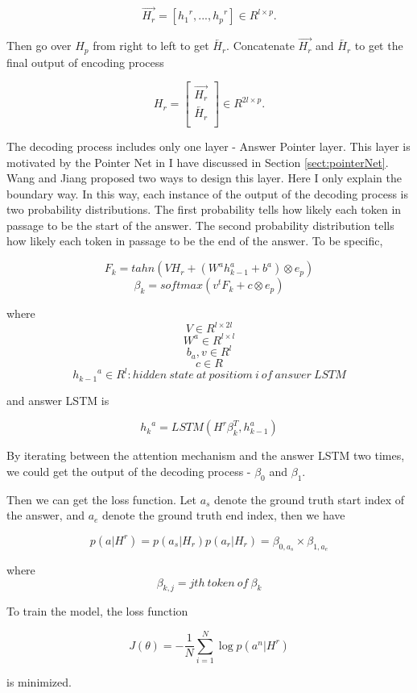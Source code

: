\documentclass[modernstyle,12pt]{sjsuthesis}
\theoremstyle{definition}
\begin{document}
$$\overrightarrow{H_r} = [{{h_{1}}^r}, ..., {{h_{p}}^r}] \in R^{l \times p}.$$

Then go over $H_p$ from right to left to get $\overleftarrow{H_r}$. Concatenate $\overrightarrow{H_r}$ and $\overleftarrow{H_r}$ to get the final output of encoding process

\[ H_r =
\begin{bmatrix}
\overrightarrow{H_r} \\
\overleftarrow{H_r} \\
\end{bmatrix}
\in R^{2l \times p}.
\]

The decoding process includes only one layer - Answer Pointer layer. This layer is motivated by the Pointer Net in \cite{vinyals2015pointer} I have discussed in Section \ref{sect:pointerNet}. Wang and Jiang proposed two ways to design this layer. Here I only explain the boundary way. In this way, each instance of the output of the decoding process is two probability distributions. The first probability tells how likely each token in passage to be the start of the answer. The second probability distribution tells how likely each token in passage to be the end of the answer. To be specific,

$$F_k = tahn(VH_r + (W^a{h^a_{k-1}} +  b^a) \otimes e_p)$$
$$\beta _k = softmax(v^tF_k + c \otimes e_p)$$


where
$$V \in R^{l \times 2l}$$
$$W^a\in R^{l \times l} $$
$$b_a, v\in R^{l}  $$
$$c \in R $$
$${h_{k-1}}^a\in R^{l}: hidden\ state\ at\ positiom\ i\ of\ answer\ LSTM  $$

and answer LSTM is


$${h_k}^a = LSTM(H^r\beta _k^T, h_{k-1}^a)$$

By iterating between the attention mechanism and the answer LSTM two times, we could get the output of the decoding process - $\beta _0$ and $\beta _1$.


Then we can get the loss function. Let $a_s$ denote the ground truth start index of the answer, and $a_e$ denote the ground truth end index, then we have

$$p(a|H^r) = p(a_s|H_r)p(a_r|H_r)=\beta _{0, a_s} \times \beta_{1, a_e}$$

where $$\beta_{k, j} = jth\ token\ of\ \beta _k$$

To train the model, the loss function

$$J(\theta) = -\frac{1}{N}\sum_{i=1}^{N} \log{p(a^n|H^r)} $$

is minimized.
\end{document}
